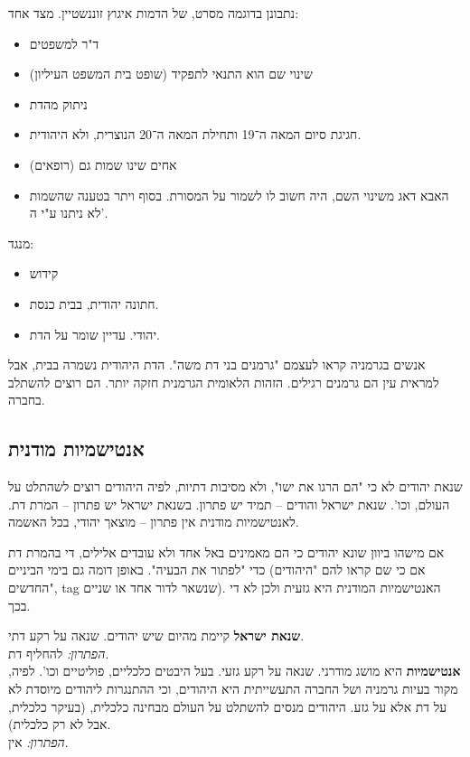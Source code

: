 \documentclass[a4paper]{book}
\begin{document}
	נתבונן בדוגמה מסרט, של הדמות איגוץ זוננשטיין. מצד אחד:
	\begin{multicols}{2}
		\begin{itemize}
			\item ד"ר למשפטים
			\item שינוי שם הוא התנאי לתפקיד (שופט בית המשפט העיליון)
			\item ניתוק מהדת
			\item חגיגת סיום המאה ה־19 ותחילת המאה ה־20 הנוצרית, ולא היהודית. 
			\item אחים שינו שמות גם (רופאים)
			\item האבא דאג משינוי השם, היה חשוב לו לשמור על המסורת. בסוף ויתר בטענה שהשמות לא ניתנו ע"י ה'. 
		\end{itemize}
	\end{multicols}
	מנגד: 
	\begin{multicols}{2}
		\begin{itemize}
			\item קידוש
			\item חתונה יהודית, בבית כנסת. 
			\item יהודי. עדיין שומר על הדת. 
		\end{itemize}
	\end{multicols}
	
	אנשים בגרמניה קראו לעצמם "גרמנים בני דת משה". הדת היהודית נשמרה בבית, אבל למראית עין הם גרמנים רגילים. הזהות הלאומית הגרמנית חזקה יותר. הם רוצים להשתלב בחברה. 
	
	\subsection{אנטישמיות מודנית}
	שנאת יהודים לא כי "הם הרגו את ישו", ולא מסיבות דתיות, לפיה היהודים רוצים לשהתלט על העולם, וכו'. שנאת ישראל והודים – תמיד יש פתרון. בשנאת ישראל יש פתרון – המרת דת. לאנטישמיות מודנית אין פתרון – מוצאך יהודי, בכל האשמה. 
	
	אם מישהו ביוון שונא יהודים כי הם מאמינים באל אחד ולא עובדים אלילים, די בהמרת דת כדי "לפתור את הבעיה". באופן דומה גם בימי הביניים (אם כי שם קראו להם "היהודים החדשים", tag שנשאר לדור אחד או שניים). האנטישמיות המודנית היא גזעית ולכן לא די בכך. 
	
	
	\textbf{שנאת ישראל} קיימת מהיום שיש יהודים. שנאה על רקע דתי. \\
	\textit{הפתרון: }להחליף דת. \\
	\textbf{אנטישמיות} היא מושג מודרני. שנאה על רקע גזעי. בעל היבטים כלכליים, פוליטיים וכו'. לפיה, מקור בעיות גרמניה ושל החברה התעשייתית היא היהודים, וכי ההתנגרות ליהודים מיוסדת לא על דת אלא על גזע. היהודים מנסים להשתלט על העולם מבחינה כלכלית,  (בעיקר כלכלית, אבל לא רק כלכלית). \\
	\textit{הפתרון: }אין. 
	
\end{document}
